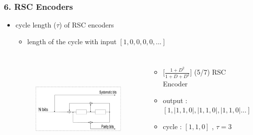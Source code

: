 \documentclass{beamer}  %
\begin{document}
\begin{frame}
\frametitle{6. RSC Encoders }
\begin{itemize}
\setlength\itemsep{2em}

\item cycle length ($\tau$) of RSC encoders
\begin{itemize}
\item length of the cycle with input $[1, 0, 0, 0, 0,...]$
\end{itemize}

\begin{example} 
\begin{columns}



\begin{figure}%
		\includegraphics[height = 4.5cm, width=\textwidth]{RSCExample3.eps}
		\label{RSC}
		\end{figure}
\begin{itemize}
\item $\Big[\frac{1+D^2}{1+D+D^2}\Big]$ (5/7)  RSC Encoder
 \item output : $[1,|1,1,0|,|1,1,0|,|1,1,0|...]$ 

 \item cycle : $[1,1,0]$ , $\tau = 3$

\end{itemize}

\end{columns}
\end{example}



\end{itemize}

\end{frame}
\end{document}
